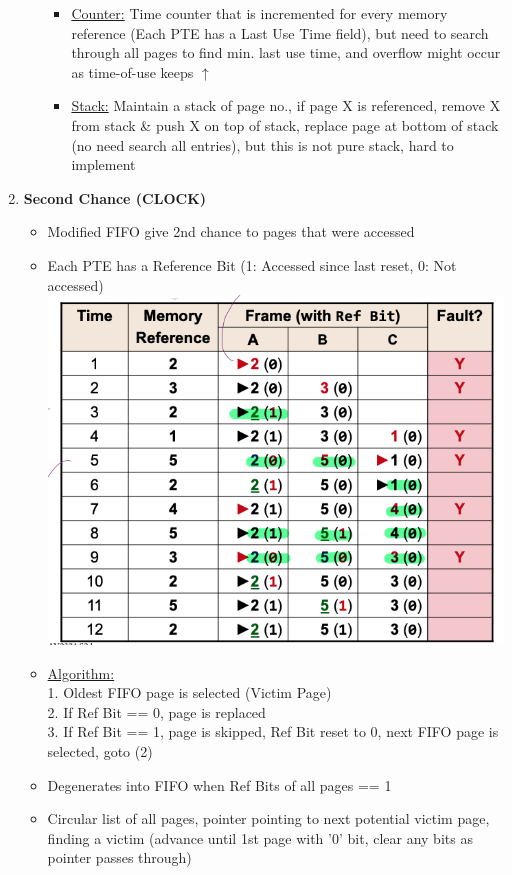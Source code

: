 \documentclass[landscape]{article}
\begin{document}
\begin{multicols*}{6}
\begin{enumerate}
\begin{itemize}
\begin{itemize}
            \item \underline{Counter:} Time counter that is incremented for every memory reference (Each PTE has a Last Use Time field), but need to search through all pages to find min. last use time, and overflow might occur as time-of-use keeps $\uparrow$
            \item \underline{Stack:} Maintain a stack of page no., if page X is referenced, remove X from stack \& push X on top of stack, replace page at bottom of stack (no need search all entries), but this is not pure stack, hard to implement
          \end{itemize}
      \end{itemize}
      \item \textbf{Second Chance (CLOCK)}
      \begin{itemize}
        \item Modified FIFO give 2nd chance to pages that were accessed
        \item Each PTE has a Reference Bit (1: Accessed since last reset, 0: Not accessed)
        \includegraphics[width=0.9\linewidth]{19_second_chance_algo.png}
        \item \underline{Algorithm:} \\
        1. Oldest FIFO page is selected (Victim Page)\\
        2. If Ref Bit == 0, page is replaced\\
        3. If Ref Bit  == 1, page is skipped, Ref Bit reset to 0, next FIFO page is selected, goto (2)
        \item Degenerates into FIFO when Ref Bits of all pages == 1
        \item {} Circular list of all pages, pointer pointing to next potential victim page, finding a victim (advance until 1st page with '0' bit, clear any bits as pointer passes through)
      \end{itemize}
    \end{enumerate}


\end{multicols*}
\end{document}
